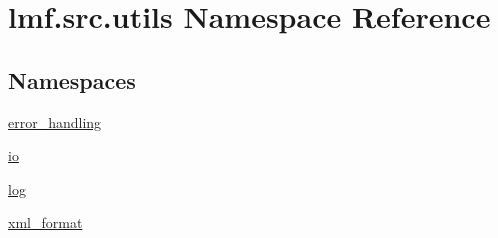 \hypertarget{namespacelmf_1_1src_1_1utils}{\section{lmf.\+src.\+utils Namespace Reference}
\label{namespacelmf_1_1src_1_1utils}
}
\subsection*{Namespaces}
\begin{DoxyCompactItemize}
\item 
 \hyperlink{namespacelmf_1_1src_1_1utils_1_1error__handling}{error\+\_\+handling}
\item 
 \hyperlink{namespacelmf_1_1src_1_1utils_1_1io}{io}
\item 
 \hyperlink{namespacelmf_1_1src_1_1utils_1_1log}{log}
\item 
 \hyperlink{namespacelmf_1_1src_1_1utils_1_1xml__format}{xml\+\_\+format}
\end{DoxyCompactItemize}
